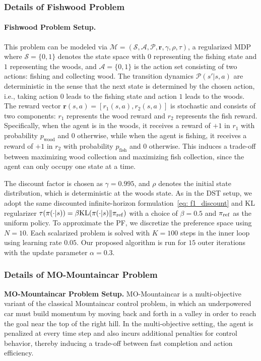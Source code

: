 \documentclass{article}
\begin{document}
\subsubsection{Details of Fishwood Problem}
\label{app:fishwood_setup}
\paragraph{Fishwood Problem Setup.}

This problem can be modeled via
$\mathcal{M}=(\mathcal{S},\mathcal{A},\mathcal{P},\mathbf{r},\gamma,\rho,\tau)$, a regularized MDP
where $\mathcal{S}=\{0,1\}$ denotes the state space with $0$ representing the fishing state and $1$ representing the woods, and $\mathcal{A}=\{0,1\}$ is the action set consisting of two actions: fishing and collecting wood. 
The transition dynamics $\mathcal{P}(s'|s,a)$ are deterministic in the sense that the next state is determined by the chosen action, i.e., taking action $0$ leads to the fishing state and action $1$ leads to the woods. The reward vector $\mathbf{r}(s,a)=[r_1(s,a),r_2(s,a)]$ is stochastic and consists of two components: $r_1$ represents the wood reward and $r_2$ represents the fish reward. Specifically, when the agent is in the woods, it receives a reward of $+1$ in $r_1$ with probability $p_{\text{wood}}$ and $0$ otherwise, while when the agent is fishing, it receives a reward of $+1$ in $r_2$ with probability $p_{\text{fish}}$ and $0$ otherwise. This induces a trade-off between maximizing wood collection and maximizing fish collection, since the agent can only occupy one state at a time.


The discount factor is chosen as $\gamma =0.995$, and $\rho$ denotes the initial state distribution, which is deterministic at the woods state. As in the DST setup, we adopt the same discounted infinite-horizon formulation~\eqref{eq: f1_discount} and KL regularizer $\tau(\pi(\cdot| s)) = \beta \mathrm{KL}( \pi(\cdot| s) \| \pi_{\rm ref})$ with a choice of $\beta=0.5$ and $\pi_{\rm ref}$ as the uniform policy. To approximate the PF, we discretize the preference space using $N=10$. Each scalarized problem is solved with $K=100$ steps in the inner loop using learning rate $0.05$. Our proposed algorithm is run for $15$ outer iterations with the update parameter $\alpha=0.3$.



\subsubsection{Details of MO-Mountaincar Problem}
\label{app:mountaincar}
\textbf{MO-Mountaincar Problem Setup.} MO-Mountaincar is a multi-objective variant of the classical Mountaincar control problem, in which an underpowered car must build momentum by moving back and forth in a valley in order to reach the goal near the top of the right hill. 
In the multi-objective setting, the agent is penalized at every time step and also incurs additional penalties for control behavior, thereby inducing a trade-off between fast completion and action efficiency.
\end{document}
